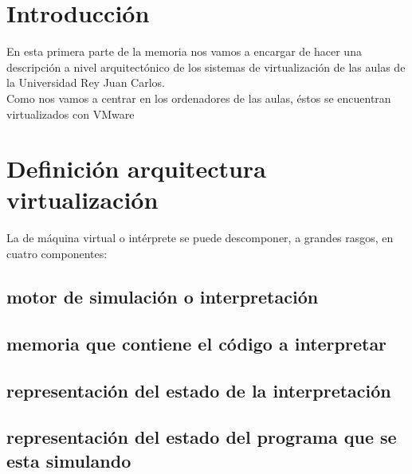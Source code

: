\chapter{Introducción}
\lettrine[lines=1,slope=4pt,findent=0pt]{E}{}n esta primera parte de la memoria nos vamos a encargar de hacer una descripción a nivel arquitectónico de los sistemas de virtualización de las aulas de la Universidad Rey Juan Carlos.\\

\noindent Como nos vamos a centrar en los ordenadores de las aulas, éstos se encuentran virtualizados con VMware~\cite{vmware}


\chapter{Definición arquitectura virtualización}

\lettrine[lines=1,slope=4pt,findent=0pt]{L}{}a de máquina virtual o intérprete se puede descomponer, a grandes rasgos, en cuatro componentes:
\section{motor de simulación o interpretación}
\section{memoria que contiene el código a interpretar}
\section{representación del estado de la interpretación}
\section{representación del estado del programa que se esta
simulando}
